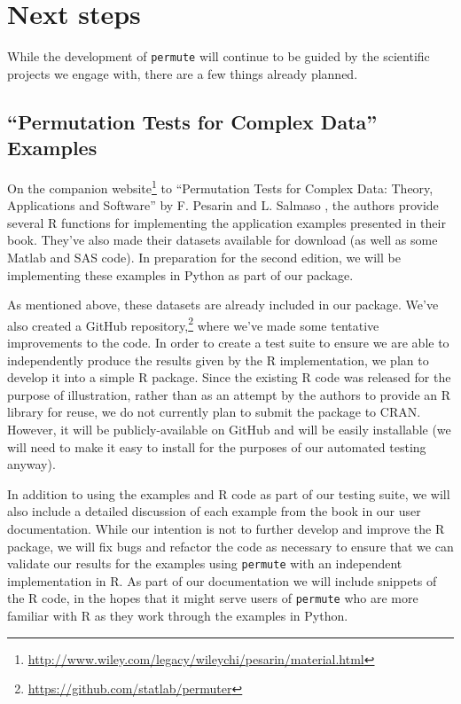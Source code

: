 \chapter{\label{ch:nextsteps}Next steps}

While the development of \texttt{permute} will continue to be guided by the
scientific projects we engage with, there are a few things already planned.

\section{\label{sec:book}``Permutation Tests for Complex Data'' Examples}

On the companion
website\footnote{\url{http://www.wiley.com/legacy/wileychi/pesarin/material.html}}
to ``Permutation Tests for Complex Data: Theory, Applications and
Software'' by F. Pesarin and L. Salmaso \cite{pesarin2010permutation}, the
authors provide several R functions for implementing the application examples
presented in their book.  They've also made their datasets available for download
(as well as some Matlab and SAS code).  In preparation for the second edition,
we will be implementing these examples in Python as part of our package.

As mentioned above, these datasets are already included in our package.  We've
also created a GitHub
repository,\footnote{\url{https://github.com/statlab/permuter}} where we've
made some tentative improvements to the code.  In order to create a test suite
to ensure we are able to independently produce the results given by the R
implementation, we plan to develop it into a simple R package.  Since the
existing R code was released for the purpose of illustration, rather than as an
attempt by the authors to provide an R library for reuse, we do not currently
plan to submit the package to CRAN.  However, it will be publicly-available on
GitHub and will be easily installable (we will need to make it easy to install
for the purposes of our automated testing anyway).

In addition to using the examples and R code as part of our testing suite, we
will also include a detailed discussion of each example from the book in our
user documentation.  While our intention is not to further develop and improve
the R package, we will fix bugs and refactor the code as necessary to ensure
that we can validate our results for the examples using \texttt{permute} with
an independent implementation in R.  As part of our documentation we will
include snippets of the R code, in the hopes that it might serve users of
\texttt{permute} who are more familiar with R as they work through the examples
in Python.

